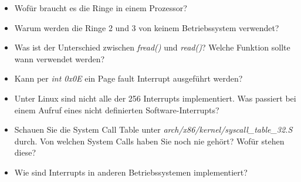 \begin{itemize}
   \item Wofür braucht es die Ringe in einem Prozessor?
   \item Warum werden die Ringe 2 und 3 von keinem Betriebssystem verwendet?
   \item Was ist der Unterschied zwischen \emph{fread()} und \emph{read()}? Welche Funktion sollte wann verwendet werden?
   \item Kann per \emph{int 0x0E} ein Page fault Interrupt ausgeführt werden?
   \item Unter Linux sind nicht alle der 256 Interrupts implementiert. Was passiert bei einem Aufruf eines nicht definierten Software-Interrupts?
   \item Schauen Sie die System Call Table unter \emph{arch/x86/kernel/syscall\_table\_32.S} durch. Von welchen System Calls haben Sie noch nie
         gehört? Wofür stehen diese?
   \item Wie sind Interrupts in anderen Betriebssystemen implementiert?
\end{itemize}

